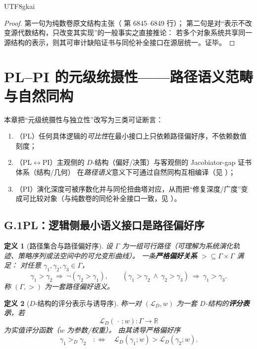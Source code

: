 \documentclass[12pt]{article}
\newtheorem{definition}{定义}[section]
\begin{document}
\begin{CJK*}{UTF8}{gkai}
\begin{proof}
第一句为纯数卷原文结构主张（\cite{GaoZheng2025GFramework} 第 6845--6849 行）；
第二句是对“表示不改变源代数结构，只改变其实现”的一般事实之直接推论：
若多个对象系统共享同一源结构的表示，则其可审计缺陷证书与同伦补全接口在源层统一。证毕。
\end{proof}

\clearpage
\section{PL--PI 的元级统摄性——路径语义范畴与自然同构}\label{app:G-plpi-sys-pathsem}

本章把“元级统摄性与独立性”改写为三类可证断言：
\begin{enumerate}
  \item （PL）任何具体逻辑的\emph{可比性}在最小接口上只依赖路径偏好序，不依赖数值刻度；
  \item （PL$\leftrightarrow$PI）主观侧的 $D$-结构（偏好/决策）与客观侧的 Jacobiator-gap 证书体系（结构/几何）
        在\emph{路径语义}意义下可通过自然同构互相编译（见 \cite{GZJacGapDStructEquiv}）；
  \item （PI）演化深度可被序数化并与同伦扭曲塔对应，从而把“修复深度/广度”变成可比较对象（与纯数卷的同伦补全接口一致，见 \cite{GaoZheng2025GFramework}）。
\end{enumerate}

\subsection{G.1\;PL：逻辑侧最小语义接口是路径偏好序}

\begin{definition}[路径集合与路径偏好序]\label{def:G-path-preference}
设 $\Gamma$ 为一组可行路径（可理解为系统演化轨迹、策略序列或法空间中的可允变形曲线）。
一条\textbf{严格偏好关系} $> \subseteq \Gamma\times\Gamma$ 满足：
对任意 $\gamma_1,\gamma_2,\gamma_3\in\Gamma$，
\[
  \gamma_1>\gamma_2\ \Rightarrow\ \neg(\gamma_2>\gamma_1),
  \qquad
  (\gamma_1>\gamma_2\ \wedge\ \gamma_2>\gamma_3)\ \Rightarrow\ \gamma_1>\gamma_3.
\]
称 $(\Gamma,>)$ 为一套路径偏好语义。
\end{definition}

\begin{definition}[$D$-结构的评分表示与诱导序]\label{def:G-D-structure}
称一对 $(\mathcal{L}_D,w)$ 为一套 $D$-结构的\textbf{评分表示}，若
\[
  \mathcal{L}_D(\,\cdot\,;w):\Gamma\to \mathbb{R}
\]
为实值评分函数（$w$ 为参数/权重）。
由其诱导严格偏好序
\[
  \gamma_1 >_D \gamma_2
  \quad:\Longleftrightarrow\quad
  \mathcal{L}_D(\gamma_1;w)>\mathcal{L}_D(\gamma_2;w).
\]
\end{definition}


\end{CJK*}
\end{document}
